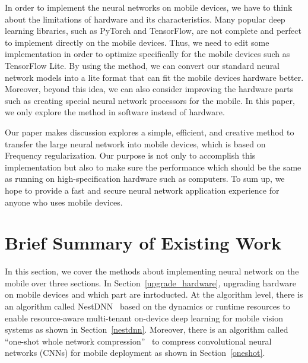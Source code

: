\documentclass[UTF8]{article}
\begin{document}
In order to implement the neural networks on mobile devices, we have to think about the limitations of hardware and its characteristics. Many popular deep learning libraries, such as PyTorch and TensorFlow, are not complete and perfect to implement directly on the mobile devices. Thus, we need to edit some implementation in order to optimize specifically for the mobile devices such as TensorFlow Lite. By using the method, we can convert our standard neural network models into a lite format that can fit the mobile devices hardware better. Moreover, beyond this idea, we can also consider improving the hardware parts such as creating special neural network processors for the mobile. In this paper, we only explore the method in software instead of hardware.

Our paper makes discussion explores a simple, efficient, and creative method to transfer the large neural network into mobile devices, which is based on Frequency regularization. Our purpose is not only to accomplish this implementation but also to make sure the performance which should be the same as running on high-specification hardware such as computers. To sum up, we hope to provide a fast and secure neural network application experience for anyone who uses mobile devices.



\section*{Brief Summary of Existing Work}

In this section, we cover the methods about implementing neural network on the mobile over three sections. In Section~\ref{upgrade_hardware}, upgrading hardware on mobile devices and which part are inrtoducted. At the algorithm level, there is an algorithm called NestDNN~\cite{fang2018nestdnn} based on the dynamics or runtime resources to enable resource-aware multi-tenant on-device deep learning for mobile vision systems as shown in Section~\ref{nestdnn}. Moreover, there is an algorithm called “one-shot whole network compression”~\cite{kim2016compression} to compress convolutional neural networks (CNNs) for mobile deployment as shown in Section~\ref{oneshot}.
\end{document}

